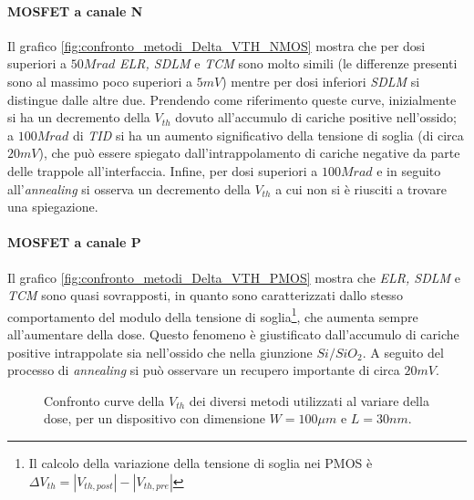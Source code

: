 \paragraph*{MOSFET a canale N} Il grafico \ref{fig:confronto_metodi_Delta_VTH_NMOS} mostra che per dosi superiori a $50 Mrad$ \textit{ELR, SDLM} e \textit{TCM} sono molto simili (le differenze presenti sono al massimo poco superiori a $5mV$) mentre per dosi inferiori \textit{SDLM} si distingue dalle altre due. Prendendo come riferimento queste curve, inizialmente si ha un decremento della $V_{th}$ dovuto all'accumulo di cariche positive nell'ossido; a $100Mrad$ di \emph{TID} si ha un aumento significativo della tensione di soglia (di circa $20mV$), che può essere spiegato dall'intrappolamento di cariche negative da parte delle trappole all'interfaccia. Infine, per dosi superiori a $100Mrad$ e in seguito all'\emph{annealing} si osserva un decremento della $V_{th}$ a cui non si è riusciti a trovare una spiegazione. 

\paragraph*{MOSFET a canale P} Il grafico \ref{fig:confronto_metodi_Delta_VTH_PMOS} mostra che \textit{ELR, SDLM} e \textit{TCM} sono quasi sovrapposti, in quanto sono caratterizzati dallo stesso comportamento del modulo della tensione di soglia\footnote{Il calcolo della variazione della tensione di soglia nei PMOS è $\Delta V_{th} = |V_{th,post}| - |V_{th,pre}|$}, che aumenta sempre all'aumentare della dose. Questo fenomeno è giustificato dall'accumulo di cariche positive intrappolate sia nell'ossido che nella giunzione $Si/SiO_2$. A seguito del processo di \emph{annealing} si può osservare un recupero importante di circa $20mV$.

\begin{figure}[ht]

  \centering
  \label{fig:confronto_metodi_VTH_NMOS}
  \label{fig:confronto_metodi_VTH_PMOS}
  
  \caption[Confronto curve della $V_{th}$ dei diversi metodi utilizzati al variare della dose]{Confronto curve della $V_{th}$ dei diversi metodi utilizzati al variare della dose, per un dispositivo con dimensione $ W=100\mu m$ e $L = 30nm$.}
  \label{fig:confronto_metodi_VTH}
  
\end{figure}


